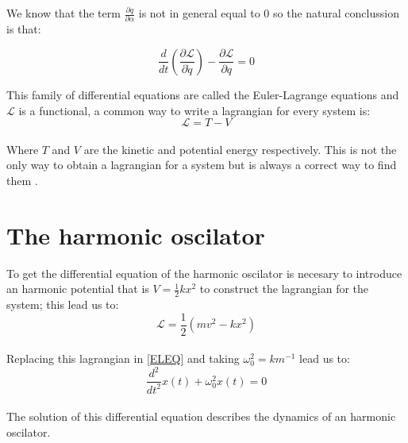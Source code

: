 \documentclass[9pt,a4paper,twocolumn,twoside]{rho-class/rho}
\begin{document}
We know that the term $\frac{\partial q}{\partial \alpha}$ is not in general equal to 0 so the natural conclussion is that:

\begin{equation}
    \frac{d}{dt}(\frac{\partial \mathcal L}{\partial \dot{q}}) - \frac{\partial \mathcal{L}}{\partial q} = 0
    \label{ELEQ}
\end{equation}

This family of differential equations are called the Euler-Lagrange equations and $\mathcal{L}$ is a functional, a common way to write a lagrangian for every system is:
\\
\begin{equation}
    \mathcal{L} = T-V
\end{equation}
\\
Where $T$ and $V$ are the kinetic and potential energy respectively. This is not the only way to obtain a lagrangian for a system but is always a correct way to find them \cite{Goldstein}. 

\section{The harmonic oscilator}
To get the differential equation of the harmonic oscilator is necesary to introduce an harmonic potential that is $V=\frac{1}{2}kx^{2}$ to construct the lagrangian for the system; this lead us to:
\\
\begin{equation*}
    \mathcal{L} = \frac{1}{2}(mv^{2} - kx^{2})
\end{equation*}
\\
Replacing this lagrangian in \ref{ELEQ} and taking $\omega_{0}^{2} = km^{-1}$ lead us to:
\\
\begin{equation}
    \frac{d^{2}}{dt^{2}} x(t) + \omega_{0}^{2}x(t) = 0
    \label{HOEQ}
\end{equation}
\\
The solution of this differential equation describes the dynamics of an harmonic oscilator.
\end{document}
